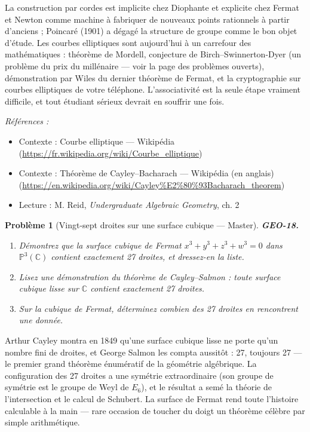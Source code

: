 \documentclass[11pt]{article}
\newtheorem{problem}{Problème}
\newenvironment{refs}{\par\small\noindent\emph{Références :}\begin{itemize}\setlength\itemsep{0pt}}{\end{itemize}\normalsize}
\begin{document}
\noindent La construction par cordes est implicite chez Diophante et explicite chez Fermat
et Newton comme machine à fabriquer de nouveaux points rationnels à partir d'anciens ; Poincaré
(1901) a dégagé la structure de groupe comme le bon objet d'étude. Les courbes elliptiques sont
aujourd'hui à un carrefour des mathématiques : théorème de Mordell, conjecture de
Birch--Swinnerton-Dyer (un problème du prix du millénaire --- voir la page des problèmes ouverts),
démonstration par Wiles du dernier théorème de Fermat, et la cryptographie sur courbes elliptiques
de votre téléphone. L'associativité est la seule étape vraiment difficile, et tout étudiant sérieux
devrait en souffrir une fois.

\begin{refs}
\item Contexte : Courbe elliptique --- Wikipédia (\url{https://fr.wikipedia.org/wiki/Courbe_elliptique})
\item Contexte : Théorème de Cayley--Bacharach --- Wikipédia (en anglais) (\url{https://en.wikipedia.org/wiki/Cayley%E2%80%93Bacharach_theorem})
\item Lecture : M. Reid, \textit{Undergraduate Algebraic Geometry}, ch. 2
\end{refs}

\bigskip

\begin{problem}[{Vingt-sept droites sur une surface cubique --- Master}]
\textbf{GEO-18.} \begin{enumerate}
\item[(a)] Démontrez que la surface cubique de Fermat $ x^3 + y^3 + z^3 + w^3 = 0 $ dans
$ \mathbb{P}^3(\mathbb{C}) $ contient exactement 27 droites, et dressez-en la liste.
\item[(b)] Lisez une démonstration du théorème de Cayley--Salmon : \textit{toute} surface cubique lisse sur
$ \mathbb{C} $ contient exactement 27 droites.
\item[(c)] Sur la cubique de Fermat, déterminez combien des 27 droites en rencontrent une donnée.
\end{enumerate}

\end{problem}

\noindent Arthur Cayley montra en 1849 qu'une surface cubique lisse ne porte qu'un nombre
fini de droites, et George Salmon les compta aussitôt : 27, toujours 27 --- le premier grand théorème
énumératif de la géométrie algébrique. La configuration des 27 droites a une symétrie
extraordinaire (son groupe de symétrie est le groupe de Weyl de $ E_6 $), et le résultat a semé
la théorie de l'intersection et le calcul de Schubert. La surface de Fermat rend toute l'histoire
calculable à la main --- rare occasion de toucher du doigt un théorème célèbre par simple
arithmétique.
\end{document}
